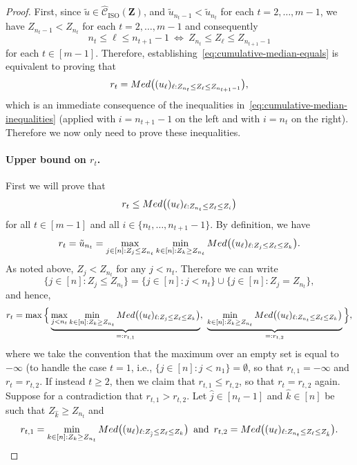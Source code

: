 \documentclass[10pt,a4paper]{amsart}
\newcommand{\ISO}{\mathrm{ISO}}
\newcommand{\bZ}{\mathbf{Z}}
\begin{document}
\begin{proof}
    First, since $\tilde{u}\in\widehat{\mathcal{C}}_\ISO(\bZ)$, and $\tilde{u}_{n_t-1}<\tilde{u}_{n_t}$ for each $t=2,\dots,m-1$, we have 
    $Z_{n_t-1} < Z_{n_t}$ for each $t=2,\dots,m-1$ and consequently
    \[n_t \leq \ell\leq n_{t+1}-1 \ \Longleftrightarrow \ Z_{n_t}\leq Z_\ell \leq Z_{n_{t+1}-1}\]
    for each $t\in[m-1]$.
    Therefore, establishing~\eqref{eq:cumulative-median-equals} is equivalent to proving that
    \[r_t = \textnormal{Med}\bigl((u_\ell)_{\ell:Z_{n_t} \leq Z_\ell \leq Z_{n_{t+1}-1}}\bigr),\]
    which is an immediate consequence of the inequalities in~\eqref{eq:cumulative-median-inequalities} (applied with $i=n_{t+1}-1$ on the left and with $i=n_t$ on the right). Therefore we now only need to prove these inequalities.

    \paragraph{Upper bound on $r_t$.}
    First we will prove that
    \begin{equation}\label{eq:cumulative-median-inequalities-1}
    r_t\leq  \textnormal{Med}\bigl((u_\ell)_{\ell:Z_{n_t}\leq Z_\ell\leq Z_i}\bigr)
\end{equation}
for all $t\in [m-1]$ and all $i\in\{n_t,\dots,n_{t+1}-1\}$.
By definition, we have 
\[r_t = \tilde{u}_{n_t} = \max_{j\in [n]: Z_j\leq Z_{n_t}}\min_{k\in [n]: Z_k\geq Z_{n_t}} \textnormal{Med}\bigl((u_\ell)_{\ell:Z_j\leq Z_\ell\leq Z_k}\bigr).\]
As noted above, $Z_j < Z_{n_t}$ for any $j<n_t$. 
Therefore we can write
\[
\{j\in[n]: Z_j \leq Z_{n_t}\} = \{j\in[n]: j< n_t\} \cup \{j\in[n]: Z_j = Z_{n_t}\},
\]
and hence,
\[
r_t = \max\Big\{\underbrace{\max_{j < n_t}\min_{k\in [n]: Z_k\geq Z_{n_t}} \textnormal{Med}\bigl((u_\ell)_{\ell:Z_j\leq Z_\ell\leq Z_k}\bigr)}_{=:r_{t,1}} , \ \underbrace{\min_{k\in [n]: Z_k\geq Z_{n_t}} \textnormal{Med}\bigl((u_\ell)_{\ell:Z_{n_t}\leq Z_\ell\leq Z_k}\bigr)}_{=:r_{t,2}}\Big\},
\]
where we take the convention that the maximum over an empty set is equal to $-\infty$ (to handle the case $t=1$, i.e., $\{j\in[n]:j<n_1\}=\emptyset$, so that $r_{t,1}=-\infty$ and $r_t = r_{t,2}$. 
If instead $t\geq 2$, then we claim that $r_{t,1}\leq r_{t,2}$, so that $r_t = r_{t,2}$ again. Suppose for a contradiction that $r_{t,1}>r_{t,2}$. Let $\hat{j}\in [n_{t}-1]$ and $\hat{k}\in [n]$ be such that $Z_{\hat{k}} \geq Z_{n_t}$ and
\begin{equation}\label{eq:expression-rt1-rt2}
    r_{t,1}=\min_{k\in [n]: Z_k\geq Z_{n_t}} \textnormal{Med}\bigl((u_\ell)_{\ell:Z_{\hat{j}}\leq Z_\ell\leq Z_k}\bigr)\, \text{ and }\,r_{t,2}=\textnormal{Med}\bigl((u_\ell)_{\ell:Z_{n_t}\leq Z_\ell\leq Z_{\hat{k}}}\bigr).

\end{equation}
\end{proof}
\end{document}

